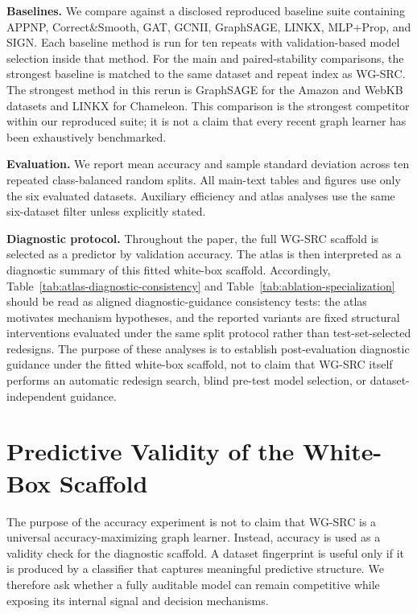 \documentclass{article}
\newcommand{\SRC}{\textsc{WG-SRC}}
\begin{document}
\textbf{Baselines.} We compare against a disclosed reproduced baseline suite containing APPNP, Correct\&Smooth, GAT, GCNII, GraphSAGE, LINKX, MLP+Prop, and SIGN. Each baseline method is run for ten repeats with validation-based model selection inside that method. For the main and paired-stability comparisons, the strongest baseline is matched to the same dataset and repeat index as \SRC{}. The strongest method in this rerun is GraphSAGE for the Amazon and WebKB datasets and LINKX for Chameleon. This comparison is the strongest competitor within our reproduced suite; it is not a claim that every recent graph learner has been exhaustively benchmarked.



\textbf{Evaluation.} We report mean accuracy and sample standard deviation across ten repeated class-balanced random splits. All main-text tables and figures use only the six evaluated datasets. Auxiliary efficiency and atlas analyses use the same six-dataset filter unless explicitly stated.

\textbf{Diagnostic protocol.} Throughout the paper, the full \SRC{} scaffold is
selected as a predictor by validation accuracy. The atlas is then interpreted
as a diagnostic summary of this fitted white-box scaffold. Accordingly,
Table~\ref{tab:atlas-diagnostic-consistency} and
Table~\ref{tab:ablation-specialization} should be read as aligned
diagnostic-guidance consistency tests: the atlas motivates mechanism
hypotheses, and the reported variants are fixed structural interventions
evaluated under the same split protocol rather than test-set-selected
redesigns. The purpose of these analyses is to establish post-evaluation diagnostic
guidance under the fitted white-box scaffold, not to claim that \SRC{} itself
performs an automatic redesign search, blind pre-test model selection, or
dataset-independent guidance.







\section{Predictive Validity of the White-Box Scaffold}



The purpose of the accuracy experiment is not to claim that \SRC{} is a
universal accuracy-maximizing graph learner. Instead, accuracy is used as a
validity check for the diagnostic scaffold. A dataset fingerprint is useful
only if it is produced by a classifier that captures meaningful predictive
structure. We therefore ask whether a fully auditable model can remain
competitive while exposing its internal signal and decision mechanisms.
\end{document}
